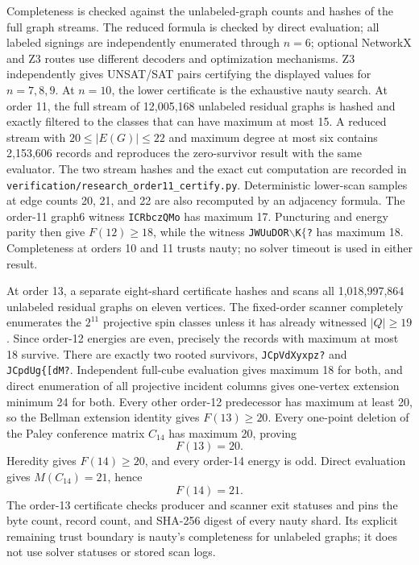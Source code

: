 \documentclass[11pt]{article}
\begin{document}
Completeness is checked against the unlabeled-graph counts and hashes of the
full graph streams.  The reduced formula is checked by direct evaluation;
all labeled signings are independently enumerated through \(n=6\); optional
NetworkX and Z3 routes use different decoders and optimization mechanisms.
Z3 independently gives UNSAT/SAT pairs certifying the displayed values for
\(n=7,8,9\).  At \(n=10\), the lower certificate is the exhaustive nauty
search.  At order 11, the full stream of 12,005,168 unlabeled residual graphs
is hashed and exactly filtered to the classes that can have maximum at most
15.  A reduced stream with
\(20\le |E(G)|\le22\) and maximum degree at most six contains 2,153,606
records and reproduces the zero-survivor result with the same evaluator.  The two
stream hashes and the exact cut computation are recorded in
\texttt{verification/research\_order11\_certify.py}.  Deterministic lower-scan
samples at edge counts 20, 21, and 22 are also recomputed by an adjacency
formula.  The order-11 graph6
witness \texttt{ICRbczQMo} has maximum 17.  Puncturing and energy parity then
give \(F(12)\ge18\), while the witness
\texttt{JWUuDOR}\(\backslash\)\texttt{K}\(\{\)\texttt{?} has maximum 18.  Completeness at orders
10 and 11 trusts nauty; no solver timeout is used in either result.

At order 13, a separate eight-shard certificate hashes and scans all
1,018,997,864 unlabeled residual graphs on eleven vertices.  The fixed-order
scanner completely enumerates the $2^{11}$ projective spin classes unless it
has already witnessed $|Q|\ge19$.  Since order-12 energies are even, precisely
the records with maximum at most 18 survive.  There are exactly two rooted
survivors,
\verb|JCpVdXyxpz?| and \verb|JCpdUg{[dM?|.  Independent full-cube
evaluation gives maximum 18 for both, and direct enumeration of all projective
incident columns gives one-vertex extension minimum 24 for both.  Every other
order-12 predecessor has maximum at least 20, so the Bellman extension identity
gives $F(13)\ge20$.  Every one-point deletion of the Paley conference matrix
$C_{14}$ has maximum 20, proving
\[
 F(13)=20.
\]
Heredity gives $F(14)\ge20$, and every order-14 energy is odd.  Direct
evaluation gives $M(C_{14})=21$, hence
\[
 F(14)=21.
\]
The order-13 certificate checks producer and scanner exit statuses and pins
the byte count, record count, and SHA-256 digest of every nauty shard.  Its
explicit remaining trust boundary is nauty's completeness for unlabeled
graphs; it does not use solver statuses or stored scan logs.
\end{document}
